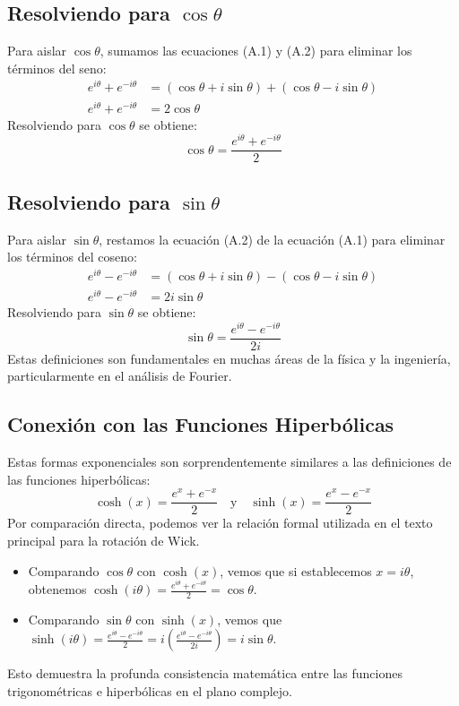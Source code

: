 \documentclass[11pt,a4paper]{article}
\begin{document}
\subsection{Resolviendo para \texorpdfstring{$\cos\theta$}{cos(theta)}}
Para aislar $\cos\theta$, sumamos las ecuaciones (A.1) y (A.2) para eliminar los términos del seno:
\begin{align*}
    e^{i\theta} + e^{-i\theta} &= (\cos\theta + i\sin\theta) + (\cos\theta - i\sin\theta) \\
    e^{i\theta} + e^{-i\theta} &= 2\cos\theta
\end{align*}
Resolviendo para $\cos\theta$ se obtiene:
\[ \boxed{\cos\theta = \frac{e^{i\theta} + e^{-i\theta}}{2}} \]

\subsection{Resolviendo para \texorpdfstring{$\sin\theta$}{sin(theta)}}
Para aislar $\sin\theta$, restamos la ecuación (A.2) de la ecuación (A.1) para eliminar los términos del coseno:
\begin{align*}
    e^{i\theta} - e^{-i\theta} &= (\cos\theta + i\sin\theta) - (\cos\theta - i\sin\theta) \\
    e^{i\theta} - e^{-i\theta} &= 2i\sin\theta
\end{align*}
Resolviendo para $\sin\theta$ se obtiene:
\[ \boxed{\sin\theta = \frac{e^{i\theta} - e^{-i\theta}}{2i}} \]
Estas definiciones son fundamentales en muchas áreas de la física y la ingeniería, particularmente en el análisis de Fourier.

\subsection{Conexión con las Funciones Hiperbólicas}

Estas formas exponenciales son sorprendentemente similares a las definiciones de las funciones hiperbólicas:
\[ \cosh(x) = \frac{e^x + e^{-x}}{2} \quad \text{y} \quad \sinh(x) = \frac{e^x - e^{-x}}{2} \]
Por comparación directa, podemos ver la relación formal utilizada en el texto principal para la rotación de Wick.
\begin{itemize}
    \item Comparando $\cos\theta$ con $\cosh(x)$, vemos que si establecemos $x=i\theta$, obtenemos $\cosh(i\theta) = \frac{e^{i\theta} + e^{-i\theta}}{2} = \cos\theta$.
    \item Comparando $\sin\theta$ con $\sinh(x)$, vemos que $\sinh(i\theta) = \frac{e^{i\theta} - e^{-i\theta}}{2} = i \left( \frac{e^{i\theta} - e^{-i\theta}}{2i} \right) = i\sin\theta$.
\end{itemize}
Esto demuestra la profunda consistencia matemática entre las funciones trigonométricas e hiperbólicas en el plano complejo.
\end{document}
